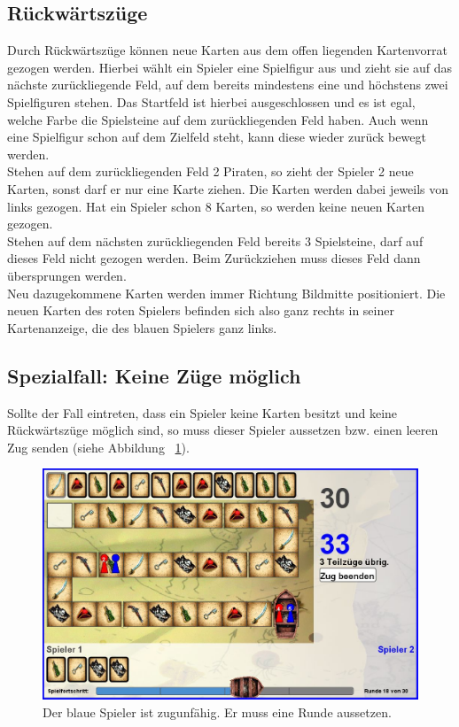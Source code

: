 \documentclass[a4paper, ngerman]{scrartcl}
\begin{document}
\subsection{Rückwärtszüge}
Durch Rückwärtszüge können neue Karten aus dem offen liegenden Kartenvorrat
gezogen werden.
Hierbei wählt ein Spieler eine Spielfigur aus und zieht sie auf das nächste
zurückliegende Feld, auf dem bereits mindestens eine und höchstens zwei
Spielfiguren stehen. Das Startfeld ist hierbei ausgeschlossen und es ist egal,
welche Farbe die Spielsteine auf dem zurückliegenden Feld haben. Auch wenn eine
Spielfigur schon auf dem Zielfeld steht, kann diese wieder zurück bewegt
werden.\\
Stehen auf dem zurückliegenden Feld 2 Piraten, so zieht der Spieler 2 neue
Karten, sonst darf er nur eine Karte ziehen. Die Karten werden dabei jeweils von
links gezogen. Hat ein Spieler schon 8 Karten, so werden keine neuen Karten
gezogen.\\
Stehen auf dem nächsten zurückliegenden Feld bereits 3 Spielsteine, darf auf
dieses Feld nicht gezogen werden. Beim Zurückziehen muss dieses Feld dann
übersprungen werden.\\
Neu dazugekommene Karten werden immer
Richtung Bildmitte positioniert. Die neuen Karten des roten Spielers befinden sich also ganz rechts in seiner
Kartenanzeige, die des blauen Spielers ganz links.



\subsection{Spezialfall: Keine Züge möglich}
	
	Sollte der Fall eintreten, dass ein Spieler keine Karten besitzt und keine
	Rückwärtszüge möglich sind, so muss dieser Spieler aussetzen bzw. einen leeren
	Zug senden (siehe Abbildung ~\ref{fig:zugunfaehig}).
	\begin{figure}[h]
	 \centering
	 \includegraphics[scale = 0.3]{bilder/zugunfaehig}
	 \caption{Der blaue Spieler ist zugunfähig. Er muss eine Runde aussetzen.}
	 \label{fig:zugunfaehig}
	\end{figure}
	
\end{document}
